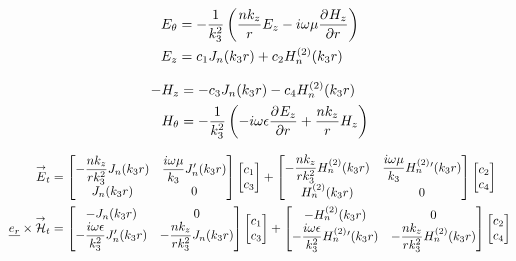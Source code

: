 \begin{align}
    E_\theta &= -\frac{1}{k_3^2}\left(\frac{nk_z}{r}E_z - i\w\mu\ddr{r}{H_z}\right)
    \\
    E_z &= c_1 J_n(k_3 r) + c_2 H_n^{(2)}(k_3 r)
\end{align}

\begin{align}
    -H_z &= -c_3 J_n(k_3 r) - c_4 H_n^{(2)}(k_3 r)
    \\
    H_\theta &= -\frac{1}{k_3^2}\left(-i\w\eps\ddr{r}{E_z} + \frac{nk_z}{r}H_z\right)
\end{align}

\begin{align}
    \vE_t &= 
    \begin{bmatrix}
        -\frac{nk_z}{rk_3^2}J_n(k_3r) & \frac{i\w\mu}{k_3}J_n'(k_3r)
        \\
        J_n(k_3r) & 0
    \end{bmatrix}
    \begin{bmatrix}
        c_1 \\
        c_3
    \end{bmatrix}
    +
    \begin{bmatrix}
        -\frac{nk_z}{rk_3^2}H_n^{(2)}(k_3r) & \frac{i\w\mu}{k_3}H_n^{(2)}{}'(k_3r)
        \\
        H_n^{(2)}(k_3r) & 0
    \end{bmatrix}
    \begin{bmatrix}
        c_2 \\
        c_4
    \end{bmatrix}
    \\
    \v{e_r}\times\vH_t &= 
    \begin{bmatrix}
        -J_n(k_3r) & 0
        \\
        -\frac{i\w\eps}{k_3^2}J_n'(k_3r) & -\frac{nk_z}{rk_3^2}J_n(k_3r)
    \end{bmatrix}
    \begin{bmatrix}
        c_1 \\
        c_3
    \end{bmatrix}
    +
    \begin{bmatrix}
        -H_n^{(2)}(k_3r) & 0
        \\
        -\frac{i\w\eps}{k_3^2}H_n^{(2)}{}'(k_3r) & -\frac{nk_z}{rk_3^2}H_n^{(2)}(k_3r)
    \end{bmatrix}
    \begin{bmatrix}
        c_2 \\
        c_4
    \end{bmatrix}
\end{align}

